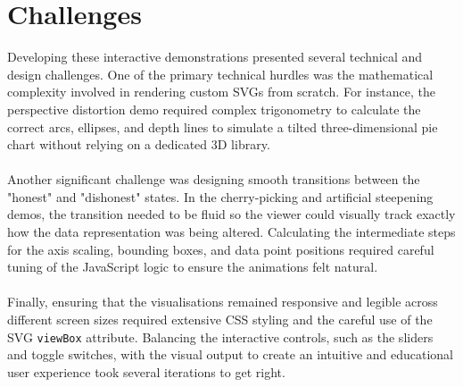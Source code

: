 \section{Challenges}
Developing these interactive demonstrations presented several technical and design challenges. One of the primary technical hurdles was the mathematical complexity involved in rendering custom SVGs from scratch. For instance, the perspective distortion demo required complex trigonometry to calculate the correct arcs, ellipses, and depth lines to simulate a tilted three-dimensional pie chart without relying on a dedicated 3D library. 
\\\\
Another significant challenge was designing smooth transitions between the "honest" and "dishonest" states. In the cherry-picking and artificial steepening demos, the transition needed to be fluid so the viewer could visually track exactly how the data representation was being altered. Calculating the intermediate steps for the axis scaling, bounding boxes, and data point positions required careful tuning of the JavaScript logic to ensure the animations felt natural.
\\\\
Finally, ensuring that the visualisations remained responsive and legible across different screen sizes required extensive CSS styling and the careful use of the SVG \texttt{viewBox} attribute. Balancing the interactive controls, such as the sliders and toggle switches, with the visual output to create an intuitive and educational user experience took several iterations to get right.

























